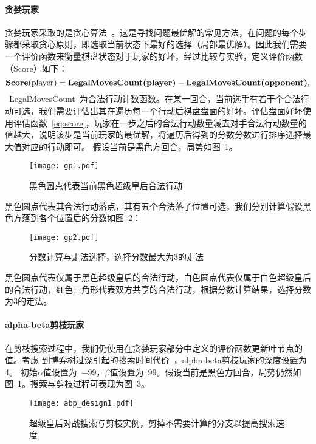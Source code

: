 \paragraph{贪婪玩家}
贪婪玩家采取的是贪心算法~\cite{introAlgo}。这是寻找问题最优解的常见方法，在问题的每个步骤都采取贪心原则，即选取当前状态下最好的选择（局部最优解）。因此我们需要一个评价函数来衡量棋盘状态对于玩家的好坏，经过比较与实验，定义评价函数（Score）如下：
\begin{equation}
    \textbf{Score}(\text{player}) = \textbf{LegalMovesCount(\text{player})} - \textbf{LegalMovesCount(\text{opponent})},
    \label{eq:score}
\end{equation}
~LegalMovesCount~为合法行动计数函数。在某一回合，当前选手有若干个合法行动可选，我们需要评估出其在遍历每一个行动后棋盘盘面的好坏。评估盘面好坏使用评估函数~\eqref{eq:score}，玩家在一步之后的合法行动数量减去对手合法行动数量的值越大，说明该步是当前玩家的最优解，将遍历后得到的分数分数进行排序选择最大值对应的行动即可。
假设当前是黑色方回合，局势如图~\ref{fig:gp1}。
\begin{figure}[htb]
    \centering
    \texttt{[image: gp1.pdf]}
    \caption[gp1]{%
        黑色圆点代表当前黑色超级皇后合法行动%
      }
    \label{fig:gp1}
\end{figure}
黑色圆点代表其合法行动落点，其有五个合法落子位置可选，我们分别计算假设黑色方落到各个位置后的分数如图~\ref{fig:gp2}：
\begin{figure}[htb]
    \centering
    \texttt{[image: gp2.pdf]}
    \caption[gp2]{%
        分数计算与走法选择，选择分数最大为3的走法%
      }
    \label{fig:gp2}
\end{figure}
黑色圆点代表仅属于黑色超级皇后的合法行动，白色圆点代表仅属于白色超级皇后的合法行动，红色三角形代表双方共享的合法行动，根据分数计算结果，选择分数为3的走法。
\paragraph{alpha-beta剪枝玩家}
在剪枝搜索过程中，我们仍使用在贪婪玩家部分中定义的评价函数更新叶节点的值。考虑
到博弈树过深引起的搜索时间代价~\cite{sstextbook}，alpha-beta剪枝玩家的深度设置为4。
初始$\alpha$值设置为~$-99$，$\beta$值设置为~$99$。假设当前是黑色方回合，局势仍然如图~\ref{fig:gp1}。搜索与剪枝过程可表现为图~\ref{fig:abpde}。
\begin{figure}[htb]
    \centering
    \texttt{[image: abp\_design1.pdf]}
    \caption[abpde]{%
        超级皇后对战搜索与剪枝实例，剪掉不需要计算的分支以提高搜索速度%
      }
    \label{fig:abpde}
\end{figure}

